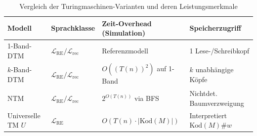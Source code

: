 \begin{table}[htbp]
    \centering
    \caption{Vergleich der Turingmaschinen-Varianten und deren Leistungsmerkmale}
    \label{tab:tm_modelle}
    \vspace{0.5em}
    \begin{tabular}{llll}
        \toprule
        \textbf{Modell} & \textbf{Sprachklasse} & \textbf{Zeit-Overhead (Simulation)} & \textbf{Speicherzugriff} \\
        \midrule
        1-Band-DTM & $\mathcal{L}_{\mathrm{RE}} / \mathcal{L}_{\mathrm{rec}}$ & Referenzmodell & 1 Lese-/Schreibkopf \\
        $k$-Band-DTM & $\mathcal{L}_{\mathrm{RE}} / \mathcal{L}_{\mathrm{rec}}$ & $O((T(n))^2)$ auf 1-Band & $k$ unabhängige Köpfe \\
        NTM & $\mathcal{L}_{\mathrm{RE}} / \mathcal{L}_{\mathrm{rec}}$ & $2^{O(T(n))}$ via BFS & Nichtdet. Baumverzweigung \\
        Universelle TM $U$ & $\mathcal{L}_{\mathrm{RE}}$ & $O(T(n) \cdot |\mathrm{Kod}(M)|)$ & Interpretiert $\mathrm{Kod}(M)\#w$ \\
        \bottomrule
    \end{tabular}
\end{table}
